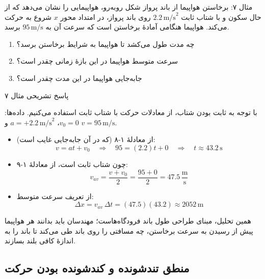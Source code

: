 \documentclass[12pt, a4paper]{article}
\begin{document}
\begin{exambox}{مثال ۷: برخاستن هواپیما از باند پرواز}
شکل روبه‌رو، هواپیمایی را نشان می‌دهد که از حال سکون و با شتاب ثابت $2.2\,\text{m/s}^2$ روی باند پرواز، در امتداد محور $x$ شروع به حرکت می‌کند. هواپیما هنگامی آمادهٔ برخاستن است که سرعت آن به $95\,\text{m/s}$ برسد.

\begin{enumerate}
    \item[الف)] چه مدت طول می‌کشد تا هواپیما به شرایط برخاستن برسد؟
    \item[ب)] سرعت متوسط هواپیما در این بازهٔ زمانی چقدر است؟
    \item[پ)] جابه‌جایی هواپیما در این مدت چقدر است؟
\end{enumerate}
\end{exambox}

\begin{answerbox}{پاسخ تشریحی مثال ۷}

با توجه به ثابت بودن شتاب، از معادلات حرکت با شتاب ثابت استفاده می‌کنیم. داده‌ها: $v_0 = 0$، $a = +2.2\,\text{m/s}^2$ و $v = 95\,\text{m/s}$.

\begin{itemize}
    \item[الف)] از معادلهٔ ۱-۸ (که در آن جابه‌جایی غایب است):
    \[
    v = at + v_0 \quad \Longrightarrow \quad 95 = (2.2)t + 0 \quad \Longrightarrow \quad t \approx 43.2\,\text{s}
    \]

    \item[ب)] چون شتاب ثابت است، از معادلهٔ ۱-۹:
    \[
    v_{av} = \frac{v + v_0}{2} = \frac{95 + 0}{2} = 47.5\,\frac{\text{m}}{\text{s}}
    \]

    \item[پ)] از تعریف سرعت متوسط:
    \[
    \Delta x = v_{av}\,\Delta t = (47.5)(43.2) \approx 2052\,\text{m}
    \]
\end{itemize}

همین تحلیل، مبنای طراحی طول باند فرودگاه‌هاست؛ مهندسان باید بدانند هر هواپیما پیش از رسیدن به سرعت برخاستن، چه مسافتی را روی باند طی می‌کند تا باند را به اندازهٔ کافی بلند بسازند.
\end{answerbox}

\subsection{منطق تندشونده و کندشونده بودن حرکت}
\end{document}
